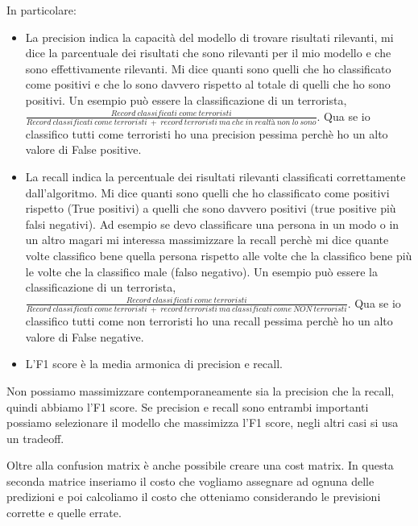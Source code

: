 \documentclass[14pt]{extreport}
\begin{document}
In particolare:
\begin{itemize}
\item La precision indica la capacità del modello di trovare risultati rilevanti, mi dice la parcentuale dei risultati che sono rilevanti per il mio modello e che sono effettivamente rilevanti. 
Mi dice quanti sono quelli che ho classificato come positivi e che lo sono davvero rispetto al totale di quelli che ho sono positivi.
Un esempio può essere la classificazione di un terrorista,\newline $\frac{Record\ classificati\ come\ terroristi}{Record\ classificati\ come\ terroristi\ +\ record \ terroristi\ ma\ che\ in\ realtà\ non\ lo\ sono}$.
Qua se io classifico tutti come terroristi ho una precision pessima perchè ho un alto valore di False positive.
\item La recall indica la percentuale dei risultati rilevanti classificati correttamente dall'algoritmo. Mi dice quanti sono quelli che ho classificato come positivi rispetto (True positivi) a quelli che sono davvero positivi (true positive più falsi negativi). Ad esempio se devo classificare una persona in un modo o in un altro magari mi interessa massimizzare la recall perchè mi dice quante volte classifico bene quella persona rispetto alle volte che la classifico bene più le volte che la classifico male (falso negativo).
Un esempio può essere la classificazione di un terrorista,\newline $\frac{Record\ classificati\ come\ terroristi}{Record\ classificati\ come\ terroristi\ +\ record \ terroristi\ ma\ classificati\ come\ NON\ terroristi}$.
Qua se io classifico tutti come non terroristi ho una recall pessima perchè ho un alto valore di False negative.
\item L'F1 score è la media armonica di precision e recall.
\end{itemize}

Non possiamo massimizzare contemporaneamente sia la precision che la recall, quindi abbiamo l'F1 score. Se precision e recall sono entrambi importanti possiamo selezionare il modello che massimizza l'F1 score, negli altri casi si usa un tradeoff.



Oltre alla confusion matrix è anche possibile creare una cost matrix. In questa seconda matrice inseriamo il costo che vogliamo assegnare ad ognuna delle predizioni e poi calcoliamo il costo che otteniamo considerando le previsioni corrette e quelle errate.
\end{document}
